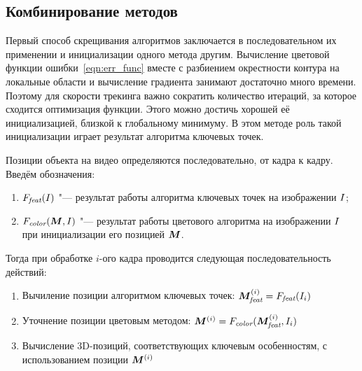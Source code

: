 \subsection{Комбинирование методов}


Первый способ скрещивания алгоритмов заключается в последовательном их
применении и инициализации одного метода другим.
Вычисление цветовой функции ошибки~\ref{eqn:err_func} вместе с разбиением
окрестности контура на локальные области и вычисление градиента занимают
достаточно
много времени.
Поэтому для скорости трекинга важно сократить количество итераций, за которое
сходится оптимизация функции.
Этого можно достичь хорошей её инициализацией, близкой к глобальному
минимуму.
В этом методе роль такой инициализации играет результат алгоритма ключевых
точек.

\newcommand{\FeatAlg}{\ensuremath{F_{\text{\it feat}}}}
\newcommand{\ColorAlg}{\ensuremath{F_{\text {\it color}}}}
\newcommand{\PoseOnFrame}[1]{\ensuremath{\Pose^{\left( #1 \right)}}}
\newcommand{\PoseI}{\ensuremath{\PoseOnFrame{i}}}
\newcommand{\FeatPoseI}{\ensuremath{\PoseI_{\text {\it feat}}}}
\newcommand{\FeatPose}{\ensuremath{\Pose_{\text {\it feat}}}}

\newcommand{\XOld}{\ensuremath{\homv{x_{\text {\it old}}}}}
\newcommand{\XNew}{\ensuremath{\homv{x_{\text{\it new}}}}}
\newcommand{\ReprErr}[1]{\ensuremath{\homv{e}( #1 )}}

Позиции объекта на видео определяются последовательно, от кадра к кадру.
Введём обозначения:

\begin{enumerate}
\item $\FeatAlg(\Img)$ "--- результат работы алгоритма ключевых точек на
изображении $I$;
\item $\ColorAlg(\Pose, \Img)$ "--- результат работы цветового алгоритма на
изображении $I$
при инициализации его позицией $\bm{M}$.
\end{enumerate}

Тогда при обработке $i$-ого кадра проводится следующая последовательность
действий:

\begin{enumerate}
\item Вычиление позиции алгоритмом ключевых точек:
    $\FeatPoseI = \FeatAlg(\Img_i)$
\item Уточнение позиции цветовым методом:
    $\PoseI = \ColorAlg(\FeatPoseI, \Img_i)$
\item Вычисление  3D-позиций, соответствующих ключевым особенностям, с
    использованием позиции $\PoseI$
\end{enumerate}


